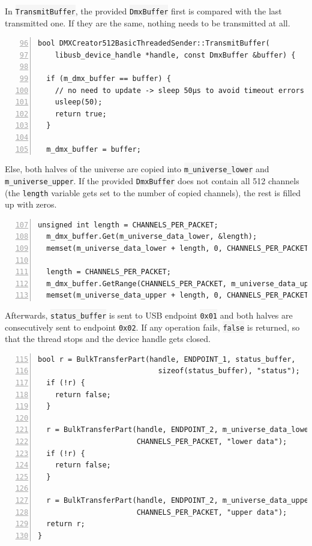 In \colorbox{WhiteSmoke}{\lstinline!TransmitBuffer!}, the provided \colorbox{WhiteSmoke}{\lstinline!DmxBuffer!} first
is compared with the last transmitted one. If they are the same, nothing
needs to be transmitted at all.

\begin{lstlisting}[numbers=left, style=myCpp, firstnumber=96]
bool DMXCreator512BasicThreadedSender::TransmitBuffer(
    libusb_device_handle *handle, const DmxBuffer &buffer) {

  if (m_dmx_buffer == buffer) {
    // no need to update -> sleep 50µs to avoid timeout errors
    usleep(50);
    return true;
  }

  m_dmx_buffer = buffer;
\end{lstlisting}

Else, both halves of the universe are copied into
\colorbox{WhiteSmoke}{\lstinline!m_universe_lower!} and \colorbox{WhiteSmoke}{\lstinline!m_universe_upper!}. If the
provided \colorbox{WhiteSmoke}{\lstinline!DmxBuffer!} does not contain all 512 channels (the
\colorbox{WhiteSmoke}{\lstinline!length!} variable gets set to the number of copied channels),
the rest is filled up with zeros.

\begin{lstlisting}[numbers=left, style=myCpp, firstnumber=107]
  unsigned int length = CHANNELS_PER_PACKET;
  m_dmx_buffer.Get(m_universe_data_lower, &length);
  memset(m_universe_data_lower + length, 0, CHANNELS_PER_PACKET - length);

  length = CHANNELS_PER_PACKET;
  m_dmx_buffer.GetRange(CHANNELS_PER_PACKET, m_universe_data_upper, &length);
  memset(m_universe_data_upper + length, 0, CHANNELS_PER_PACKET - length);
\end{lstlisting}

Afterwards, \colorbox{WhiteSmoke}{\lstinline!status_buffer!} is sent to USB endpoint
\colorbox{WhiteSmoke}{\lstinline!0x01!} and both halves are consecutively sent to endpoint
\colorbox{WhiteSmoke}{\lstinline!0x02!}. If any operation fails, \colorbox{WhiteSmoke}{\lstinline!false!} is returned,
so that the thread stops and the device handle gets closed.

\begin{lstlisting}[numbers=left, style=myCpp, firstnumber=115]
  bool r = BulkTransferPart(handle, ENDPOINT_1, status_buffer,
                            sizeof(status_buffer), "status");
  if (!r) {
    return false;
  }

  r = BulkTransferPart(handle, ENDPOINT_2, m_universe_data_lower,
                       CHANNELS_PER_PACKET, "lower data");
  if (!r) {
    return false;
  }

  r = BulkTransferPart(handle, ENDPOINT_2, m_universe_data_upper,
                       CHANNELS_PER_PACKET, "upper data");
  return r;
}
\end{lstlisting}

